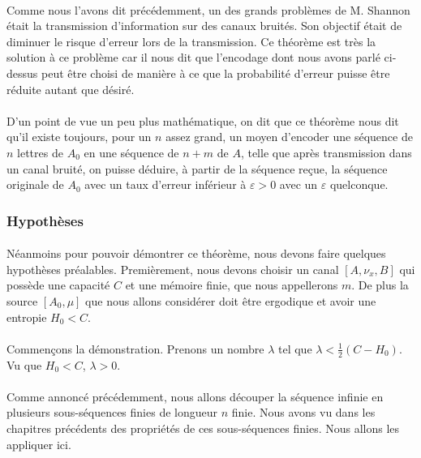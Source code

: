 	\paragraph{}
	Comme nous l'avons dit précédemment, un des grands problèmes de M. Shannon
	était la transmission d'information sur des canaux bruités. Son objectif
	était de diminuer le risque d'erreur lors de la transmission. Ce théorème
	est très la solution à ce problème car il nous dit que l'encodage dont 
	nous avons parlé ci-dessus peut être choisi de manière à ce que la 
	probabilité d'erreur puisse être réduite autant que désiré.

	\paragraph{}
	D'un point de vue un peu plus mathématique, on dit que ce théorème nous dit
	qu'il existe toujours, pour un $n$ assez grand, un moyen d'encoder une 
	séquence de $n$ lettres de $A_0$ en une séquence de $n+m$ de $A$, telle
	que après transmission dans un canal bruité, on puisse déduire, 
	à partir de la séquence reçue, la séquence originale de $A_0$ avec un taux
	d'erreur inférieur à $\varepsilon >0$ avec un $\varepsilon$ quelconque.
	
\subsubsection*{Hypothèses}
	
	\paragraph{}
	Néanmoins pour pouvoir démontrer ce théorème, nous devons faire quelques
	hypothèses préalables. Premièrement, nous devons choisir un
	canal $[A,\nu_x,B]$ qui possède une capacité $C$ et une mémoire finie,
	que nous appellerons $m$. De plus la source $[A_0,\mu]$ que nous allons
	considérer doit être ergodique et avoir une entropie $H_0 < C$.

	\paragraph{}
	Commençons la démonstration. Prenons un nombre $\lambda$ tel que 
	$\lambda<\frac{1}{2}(C-H_0)$. Vu que $H_0 < C$, $\lambda>0$. 
	
	\paragraph{}
	Comme annoncé précédemment, nous allons découper la séquence infinie
	en plusieurs sous-séquences finies de longueur $n$ finie. Nous avons
	vu dans les chapitres précédents des propriétés de ces sous-séquences
	finies. Nous allons les appliquer ici.

